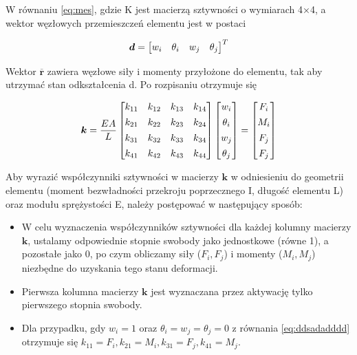 W równaniu \ref{eq:mes}, gdzie K jest macierzą sztywności o wymiarach 4×4, a wektor węzłowych przemieszczeń elementu jest w postaci

\begin{equation}
\label{eq:ddsadadddd}
\boldsymbol{d} =
    \begin{bmatrix}
        w_i & \theta_i & w_j & \theta_j
    \end{bmatrix}^T
\end{equation}

Wektor $\overline{\bm{r}}$ zawiera węzłowe siły i momenty przyłożone do elementu, tak aby utrzymać stan odkształcenia d.
Po rozpisaniu otrzymuje się

\begin{equation}
\label{eq:adadssadsssad}
\boldsymbol{k} =
    \frac{EA}{L}
    \begin{bmatrix}
        k_{11} & k_{12} & k_{13} & k_{14} \\[1ex]
        k_{21} & k_{22} & k_{23} & k_{24} \\[1ex]
        k_{31} & k_{32} & k_{33} & k_{34} \\[1ex]
        k_{41} & k_{42} & k_{43} & k_{44} \\
    \end{bmatrix}
    \begin{bmatrix}
        w_i \\[1ex]
        \theta_i \\[1ex]
        w_j \\[1ex]
        \theta_j \\
    \end{bmatrix}
    =
    \begin{bmatrix}
        F_i \\[1ex]
        M_i \\[1ex]
        F_j \\[1ex]
        F_j \\
    \end{bmatrix}
\end{equation}

Aby wyrazić współczynniki sztywności w macierzy $\bm{k}$ w odniesieniu do geometrii elementu (moment bezwładności przekroju poprzecznego I, długość elementu L) oraz modułu sprężystości E, należy postępować w następujący sposób:

\begin{itemize}
    \item W celu wyznaczenia współczynników sztywności dla każdej kolumny macierzy $\bm{k}$, ustalamy odpowiednie stopnie swobody jako jednostkowe (równe 1), a pozostałe jako 0, po czym obliczamy siły ($F_i, F_j$) i momenty ($M_i, M_j$) niezbędne do uzyskania tego stanu deformacji.
    \item Pierwsza kolumna macierzy $\bm{k}$ jest wyznaczana przez aktywację tylko pierwszego stopnia swobody.
    \item Dla przypadku, gdy $w_i=1$ oraz $\theta_i=w_j=\theta_j=0$ z równania \ref{eq:ddsadadddd} otrzymuje się $k_{11}=F_i, k_{21}=M_i, k_{31}=F_j, k_{41}=M_j$.
\end{itemize}

